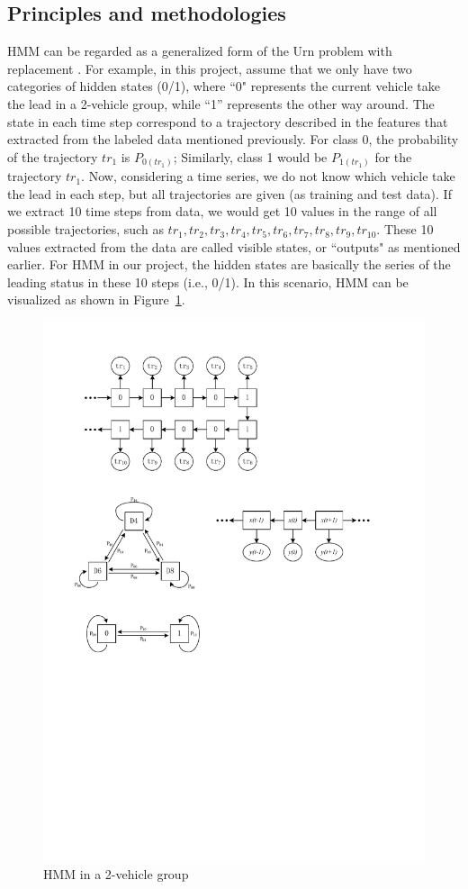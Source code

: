 \documentclass[conference]{IEEEtran}
\begin{document}
\subsection{Principles and methodologies}
HMM can be regarded as a generalized form of the Urn problem with replacement \cite{hmm3}. For example, in this project, assume that we only have two categories of hidden states (0/1), where ``0" represents the current vehicle take the lead in a 2-vehicle group, while ``1” represents the other way around. The state in each time step correspond to a trajectory described in the features that extracted from the labeled data mentioned previously. For class 0, the probability of the trajectory $tr_1$ is $P_{0(tr_1)}$; Similarly, class 1 would be $P_{1(tr_1)}$ for the trajectory $tr_1$. Now, considering a time series, we do not know which vehicle take the lead in each step, but all trajectories are given (as training and test data). If we extract 10 time steps from data, we would get 10 values in the range of all possible trajectories, such as  $tr_1, tr_2, tr_3, tr_4, tr_5, tr_6, tr_7, tr_8, tr_9, tr_{10}$. These 10 values extracted from the data are called visible states, or ``outputs" as mentioned earlier. For HMM in our project, the hidden states are basically the series of the leading status in these 10 steps (i.e., 0/1). In this scenario, HMM can be visualized as shown in Figure~\ref{fig:HMMcar}.
\begin{figure}[H]
	\centering
	\includegraphics[scale=0.9]{HMMcar.pdf}
	\caption{HMM in a 2-vehicle group}
	\label{fig:HMMcar}
\end{figure}
\end{document}
